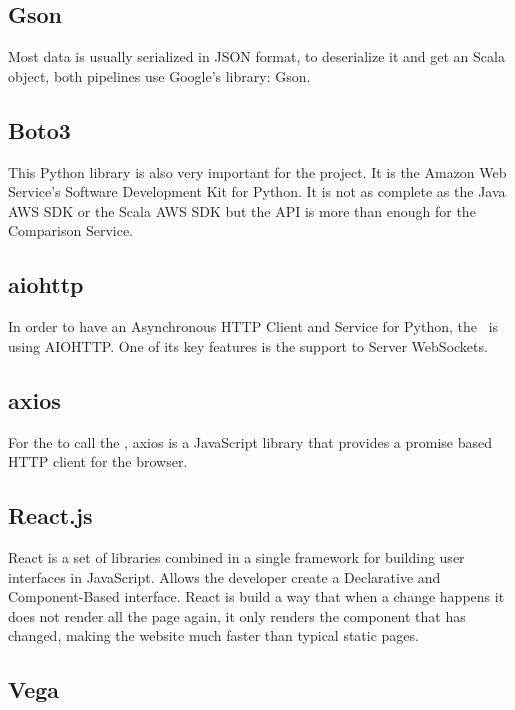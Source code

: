 \subsection*{Gson\cite{gson}} \label{gson}

Most data is usually serialized in JSON\cite{json} format, to deserialize it and get an Scala object, both pipelines use Google's library: Gson.

\subsection*{Boto3\cite{boto3}} \label{boto3}

This Python library is also very important for the project. It is the Amazon Web Service's Software Development Kit for Python. It is not as complete as the Java AWS SDK or the Scala AWS SDK but the  API is more than enough for the Comparison Service.

\subsection*{aiohttp\cite{aiohttp}} \label{aiohttp}

In order to have an Asynchronous HTTP Client and Service for Python, the \thesis\ is using AIOHTTP. One of its key features is the support to Server WebSockets.

\subsection*{axios\cite{axios}} \label{axios}

For the  to call the , axios is a JavaScript library that provides a promise based HTTP client for the browser.

\subsection*{React.js\cite{reactjs}} \label{reactjs}

React is a set of libraries combined in a single framework for building user interfaces in JavaScript. Allows the developer create a Declarative and Component-Based interface. React is build a way that when a change happens it does not render all the page again, it only renders the component that has changed, making the website much faster than typical static pages.

\subsection*{Vega\cite{vega}} \label{vega}

